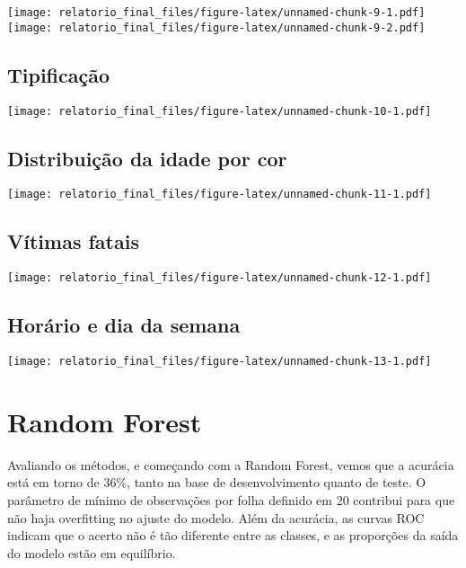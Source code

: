 \documentclass[
  12pt,
  portuguese,
]{report}
\begin{document}
\texttt{[image: relatorio\_final\_files/figure-latex/unnamed-chunk-9-1.pdf]} \texttt{[image: relatorio\_final\_files/figure-latex/unnamed-chunk-9-2.pdf]}

\hypertarget{tipificauxe7uxe3o}{%
\subsection{Tipificação}\label{tipificauxe7uxe3o}}

\texttt{[image: relatorio\_final\_files/figure-latex/unnamed-chunk-10-1.pdf]}

\hypertarget{distribuiuxe7uxe3o-da-idade-por-cor}{%
\subsection{Distribuição da idade por cor}\label{distribuiuxe7uxe3o-da-idade-por-cor}}

\texttt{[image: relatorio\_final\_files/figure-latex/unnamed-chunk-11-1.pdf]}

\hypertarget{vuxedtimas-fatais}{%
\subsection{Vítimas fatais}\label{vuxedtimas-fatais}}

\texttt{[image: relatorio\_final\_files/figure-latex/unnamed-chunk-12-1.pdf]}

\hypertarget{horuxe1rio-e-dia-da-semana}{%
\subsection{Horário e dia da semana}\label{horuxe1rio-e-dia-da-semana}}

\texttt{[image: relatorio\_final\_files/figure-latex/unnamed-chunk-13-1.pdf]}

\hypertarget{random-forest-1}{%
\section{Random Forest}\label{random-forest-1}}

Avaliando os métodos, e começando com a Random Forest, vemos que a acurácia está em torno de 36\%, tanto na base de desenvolvimento quanto de teste. O parâmetro de mínimo de observações por folha definido em 20 contribui para que não haja overfitting no ajuste do modelo. Além da acurácia, as curvas ROC indicam que o acerto não é tão diferente entre as classes, e as proporções da saída do modelo estão em equilíbrio.
\end{document}
